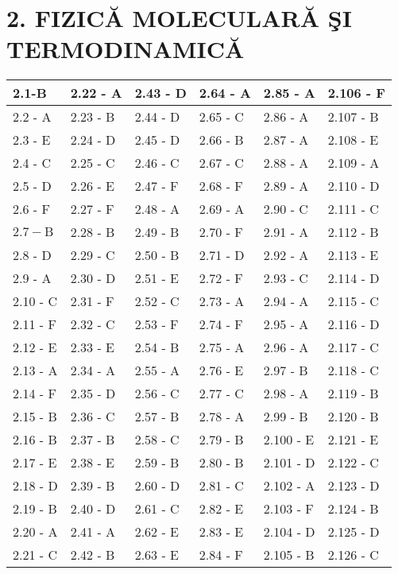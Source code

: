
\section*{2. FIZICĂ MOLECULARĂ ŞI TERMODINAMICĂ}
\begin{center}
\begin{tabular}{|l|l|l|l|l|l|}
\hline
2.1-B & 2.22 - A & 2.43 - D & 2.64 - A & 2.85 - A & 2.106 - F \\
\hline
2.2 - A & 2.23 - B & 2.44 - D & 2.65 - C & 2.86 - A & 2.107 - B \\
\hline
2.3 - E & 2.24 - D & 2.45 - D & 2.66 - B & 2.87 - A & 2.108 - E \\
\hline
2.4 - C & 2.25 - C & 2.46 - C & 2.67 - C & 2.88 - A & 2.109 - A \\
\hline
2.5 - D & 2.26 - E & 2.47 - F & 2.68 - F & 2.89 - A & 2.110 - D \\
\hline
2.6 - F & 2.27 - F & 2.48 - A & 2.69 - A & 2.90 - C & 2.111 - C \\
\hline
$2.7-\mathrm{B}$ & 2.28 - B & 2.49 - B & 2.70 - F & 2.91 - A & 2.112 - B \\
\hline
2.8 - D & 2.29 - C & 2.50 - B & 2.71 - D & 2.92 - A & 2.113 - E \\
\hline
2.9 - A & 2.30 - D & 2.51 - E & 2.72 - F & 2.93 - C & 2.114 - D \\
\hline
2.10 - C & 2.31 - F & 2.52 - C & 2.73 - A & 2.94 - A & 2.115 - C \\
\hline
2.11 - F & 2.32 - C & 2.53 - F & 2.74 - F & 2.95 - A & 2.116 - D \\
\hline
2.12 - E & 2.33 - E & 2.54 - B & 2.75 - A & 2.96 - A & 2.117 - C \\
\hline
2.13 - A & 2.34 - A & 2.55 - A & 2.76 - E & 2.97 - B & 2.118 - C \\
\hline
2.14 - F & 2.35 - D & 2.56 - C & 2.77 - C & 2.98 - A & 2.119 - B \\
\hline
2.15 - B & 2.36 - C & 2.57 - B & 2.78 - A & 2.99 - B & 2.120 - B \\
\hline
2.16 - B & 2.37 - B & 2.58 - C & 2.79 - B & 2.100 - E & 2.121 - E \\
\hline
2.17 - E & 2.38 - E & 2.59 - B & 2.80 - B & 2.101 - D & 2.122 - C \\
\hline
2.18 - D & 2.39 - B & 2.60 - D & 2.81 - C & 2.102 - A & 2.123 - D \\
\hline
2.19 - B & 2.40 - D & 2.61 - C & 2.82 - E & 2.103 - F & 2.124 - B \\
\hline
2.20 - A & 2.41 - A & 2.62 - E & 2.83 - E & 2.104 - D & 2.125 - D \\
\hline
2.21 - C & 2.42 - B & 2.63 - E & 2.84 - F & 2.105 - B & 2.126 - C \\
\hline
\end{tabular}
\end{center}

